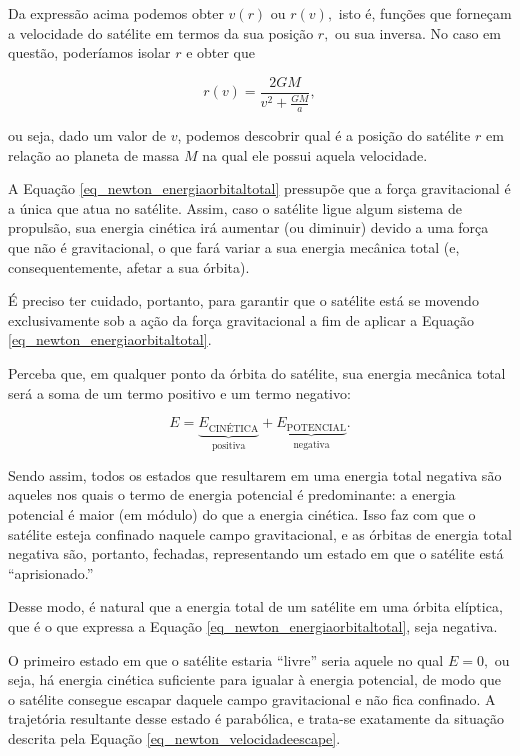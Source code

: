 Da expressão acima podemos obter $v(r)$ ou $r(v),$ isto é, funções que forneçam a velocidade do satélite em termos da sua posição $r,$ ou sua inversa. No caso em questão, poderíamos isolar $r$ e obter que

$$ r(v) = \frac{2GM}{v^2 + \frac{GM}{a}}, $$

\noindent ou seja, dado um valor de $v$, podemos descobrir qual é a posição do satélite $r$ em relação ao planeta de massa $M$ na qual ele possui aquela velocidade.



A Equação \eqref{eq_newton_energiaorbitaltotal} pressupõe que a força gravitacional é a única que atua no satélite. Assim, caso o satélite ligue algum sistema de propulsão, sua energia cinética irá aumentar (ou diminuir) devido a uma força que não é gravitacional, o que fará variar a sua energia mecânica total (e, consequentemente, afetar a sua órbita). 

É preciso ter cuidado, portanto, para garantir que o satélite está se movendo exclusivamente sob a ação da força gravitacional a fim de aplicar a Equação \eqref{eq_newton_energiaorbitaltotal}.




Perceba que, em qualquer ponto da órbita do satélite, sua energia mecânica total será a soma de um termo positivo e um termo negativo:

$$ E = \underbrace{ E_\text{CINÉTICA}}_{\text{positiva}} +  \underbrace{ E_\text{POTENCIAL}}_{\text{negativa}}.$$

Sendo assim, todos os estados que resultarem em uma energia total negativa são aqueles nos quais o termo de energia potencial é predominante: a energia potencial é maior (em módulo) do que a energia cinética. Isso faz com que o satélite esteja confinado naquele campo gravitacional, e as órbitas de energia total negativa são, portanto, fechadas, representando um estado em que o satélite está ``aprisionado.''

Desse modo, é natural que a energia total de um satélite em uma órbita elíptica, que é o que expressa a Equação \eqref{eq_newton_energiaorbitaltotal}, seja negativa. 

O primeiro estado em que o satélite estaria ``livre'' seria aquele no qual $E=0,$ ou seja, há energia cinética suficiente para igualar à energia potencial, de modo que o satélite consegue escapar daquele campo gravitacional e não fica confinado. A trajetória resultante desse estado é parabólica, e trata-se exatamente da situação descrita pela Equação \eqref{eq_newton_velocidadeescape}.

